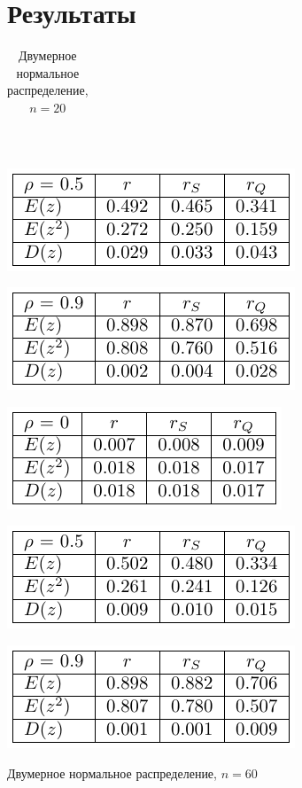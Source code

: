 \documentclass[a4paper]{article}
\begin{document}
\section{Результаты}
\begin{table}[H]
    \centering
    \begin{tabular}{|l|c|c|c|}
    \hline 
    
    \end{tabular}\\
    \begin{center}
        \includegraphics[]{LabSrcs/resources/20rho0.5.pdf}
    \end{center}
    \begin{center}
        \includegraphics{LabSrcs/resources/20rho0.9.pdf}
    \end{center}
    \caption{Двумерное нормальное распределение, $n=20$}
    \label{tab:my_label}
\end{table}
\begin{table}[H]
    \begin{center}
    \includegraphics[]{LabSrcs/resources/60rho0.pdf}
    \end{center}
    \begin{center}
    \includegraphics[]{LabSrcs/resources/60rho0.5.pdf}
    \end{center}
    \begin{center}
    \includegraphics[]{LabSrcs/resources/60rho0.9.pdf}
    \end{center}
    \caption{Двумерное нормальное распределение, $n=60$}
    \label{tab:my_label}
\end{table}
\end{document}
